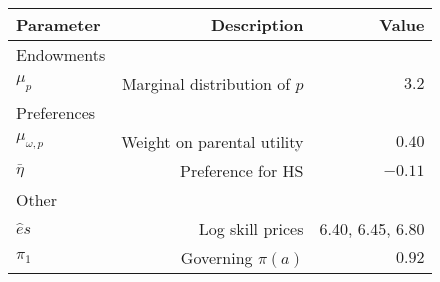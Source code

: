 \begin{tabular}{lrr}
\hline
Parameter & Description  & Value  \\ 
\hline
Endowments &   &   \\ 
$\mu_{p}$ & Marginal distribution of $p$  & $3.2$  \\ 
Preferences &   &   \\ 
$\mu_{\omega,p}$ & Weight on parental utility  & $0.40$  \\ 
$\bar{\eta}$ & Preference for HS  & $-0.11$  \\ 
Other &   &   \\ 
$\hat{e}{s}$ & Log skill prices  & 6.40, 6.45, 6.80  \\ 
$\pi_{1}$ & Governing $\pi(a)$  & $0.92$  \\ 
\hline
\end{tabular}%
